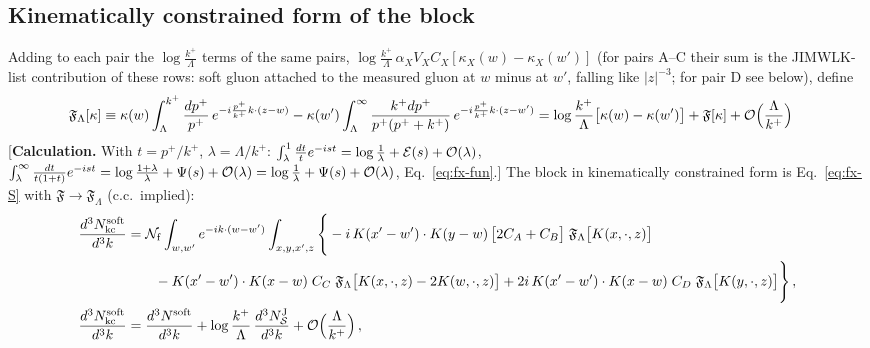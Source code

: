 \documentclass[9pt]{article}
\numberwithin{equation}{section}
\begin{document}
{\subsection*{Kinematically constrained form of the block}
 Adding to each pair the $\log\frac{k^{+}}{\Lambda}$ terms of the same pairs, $\log\frac{k^{+}}{\Lambda}\,\alpha_{X}V_{X}C_{X}[\kappa_{X}(w)-\kappa_{X}(w')]$ (for pairs A--C their sum is the JIMWLK-list contribution of these rows: soft gluon attached to the measured gluon at $w$ minus at $w'$, falling like $|z|^{-3}$; for pair D see below), define
\begin{align}
\mathfrak{F}_{\Lambda}[\kappa]&\equiv\kappa(w)\int_{\Lambda}^{k^{+}}\frac{dp^{+}}{p^{+}}\,e^{-i\frac{p^{+}}{k^{+}}k\cdot(z-w)}-\kappa(w')\int_{\Lambda}^{\infty}\frac{k^{+}dp^{+}}{p^{+}(p^{+}+k^{+})}\,e^{-i\frac{p^{+}}{k^{+}}k\cdot(z-w')}
=\log\frac{k^{+}}{\Lambda}\big[\kappa(w)-\kappa(w')\big]+\mathfrak{F}[\kappa]+{\cal O}\Big(\frac{\Lambda}{k^{+}}\Big)\label{eq:fx-FLam}
\end{align}
[\textbf{Calculation.} With $t=p^{+}/k^{+}$, $\lambda=\Lambda/k^{+}$: $\int_{\lambda}^{1}\frac{dt}{t}e^{-ist}=\log\frac{1}{\lambda}+\mathcal{E}(s)+{\cal O}(\lambda)$, $\int_{\lambda}^{\infty}\frac{dt}{t(1+t)}e^{-ist}=\log\frac{1+\lambda}{\lambda}+\Psi(s)+{\cal O}(\lambda)=\log\frac{1}{\lambda}+\Psi(s)+{\cal O}(\lambda)$, Eq.~\eqref{eq:fx-fun}.] The block in kinematically constrained form is Eq.~\eqref{eq:fx-S} with $\mathfrak{F}\to\mathfrak{F}_{\Lambda}$ (c.c.\ implied):
\begin{align}
\frac{d^{3}N^{\rm soft}_{\rm kc}}{d^{3}k}&=\mathcal{N}_{\rm f}\int_{w,w'}e^{-ik\cdot(w-w')}\int_{x,y,x',z}\Bigg\{-i\,K(x'-w')\cdot K(y-w)\,\big[2C_{A}+C_{B}\big]\;\mathfrak{F}_{\Lambda}\big[K(x,\cdot,z)\big]\notag\\
&\qquad-K(x'-w')\cdot K(x-w)\;C_{C}\;\mathfrak{F}_{\Lambda}\big[K(x,\cdot,z)-2K(w,\cdot,z)\big]+2i\,K(x'-w')\cdot K(x-w)\;C_{D}\;\mathfrak{F}_{\Lambda}\big[K(y,\cdot,z)\big]\Bigg\}\,,\label{eq:fx-Skc}\\
\frac{d^{3}N^{\rm soft}_{\rm kc}}{d^{3}k}&=\frac{d^{3}N^{\rm soft}}{d^{3}k}+\log\frac{k^{+}}{\Lambda}\,\frac{d^{3}N^{\rm J}_{\mathcal{S}}}{d^{3}k}+{\cal O}\Big(\frac{\Lambda}{k^{+}}\Big)\,,\label{eq:fx-kcequiv}
\end{align}
}
\end{document}
